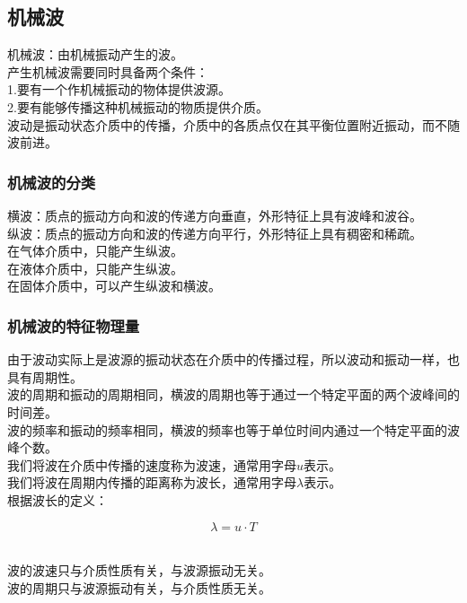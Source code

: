 \documentclass[UTF8]{ctexart}
\begin{document}
\newpage

\subsection{机械波}
    机械波：由机械振动产生的波。\\[4mm]
    产生机械波需要同时具备两个条件：\\[3mm]
    1.要有一个作机械振动的物体提供波源。\\[3mm]
    2.要有能够传播这种机械振动的物质提供介质。\\[4mm]
    波动是振动状态介质中的传播，介质中的各质点仅在其平衡位置附近振动，而不随波前进。

\subsubsection{机械波的分类}
    横波：质点的振动方向和波的传递方向垂直，外形特征上具有波峰和波谷。\\[3mm]
    纵波：质点的振动方向和波的传递方向平行，外形特征上具有稠密和稀疏。\\[4mm]
    在气体介质中，只能产生纵波。\\[2mm]
    在液体介质中，只能产生纵波。\\[2mm]
    在固体介质中，可以产生纵波和横波。

\subsubsection{机械波的特征物理量}
    由于波动实际上是波源的振动状态在介质中的传播过程，所以波动和振动一样，也具有周期性。\\[3mm]
    波的周期和振动的周期相同，横波的周期也等于通过一个特定平面的两个波峰间的时间差。\\[3mm]
    波的频率和振动的频率相同，横波的频率也等于单位时间内通过一个特定平面的波峰个数。\\[5mm]
    我们将波在介质中传播的速度称为波速，通常用字母$u$表示。\\[3mm]
    我们将波在周期内传播的距离称为波长，通常用字母$\lambda$表示。\\[5mm]
    根据波长的定义：
    \begin{large}
        \begin{equation*}
            \lambda=u\cdot T
        \end{equation*}
    \end{large}\\
    波的波速只与介质性质有关，与波源振动无关。\\[3mm]
    波的周期只与波源振动有关，与介质性质无关。
\end{document}
